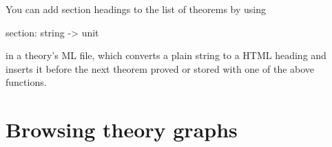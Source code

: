 You can add section headings to the list of theorems by using

\begin{ttbox}
section: string -> unit
\end{ttbox}

in a theory's ML file, which converts a plain string to a HTML heading
and inserts it before the next theorem proved or stored with one of
the above functions.


%
%
%
%
%


\section{Browsing theory graphs} \label{sec:browse}

